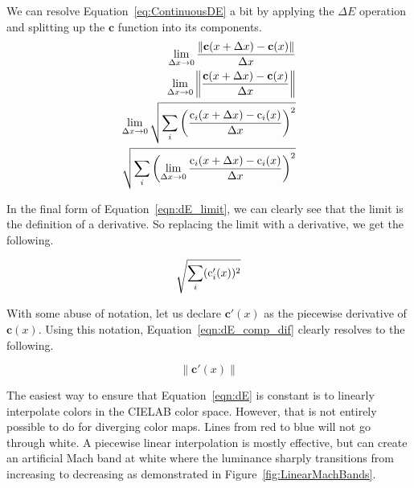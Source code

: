 \documentclass{acmsiggraph}               %
\newcommand{\Lab}{CIELAB\xspace}
\newcommand{\DeltaE}{\ensuremath{\Delta{}E}\xspace}
\newcommand*{\cvec}[1]{\mathbf{#1}}
\begin{document}
We can resolve Equation~\ref{eq:ContinuousDE} a bit by applying the \DeltaE
operation and splitting up the $\cvec{c}$ function into its components.
\begin{equation}
  \begin{split}
    { \lim_{\Delta x \rightarrow 0}
      \frac{\left\lVert \cvec{c}(x+\Delta x) - \cvec{c}(x) \right\rVert}
      {\Delta x}} \\
    { \lim_{\Delta x \rightarrow 0}
      \left\lVert \frac{\cvec{c}(x+\Delta x)- \cvec{c}(x)}
	  {\Delta x} \right\rVert } \\
    { \lim_{\Delta x \rightarrow 0}
      \sqrtsign{ \sum_i \left( \frac
	  {\operatorname{c}_i(x+\Delta x)
	    - \operatorname{c}_i(x)}
	  {\Delta x} \right)^2 } } \\
    {\sqrtsign{ \sum_i \left( \lim_{\Delta x \rightarrow 0}
       \frac
	  {\operatorname{c}_i(x+\Delta x)
	    - \operatorname{c}_i(x)}
	  {\Delta x} \right)^2 } }
  \end{split}
  \label{eqn:dE_limit}
\end{equation}

In the final form of Equation~\ref{eqn:dE_limit}, we can clearly see that
the limit is the definition of a derivative.  So replacing the limit with a
derivative, we get the following.

\begin{equation}
  \sqrtsign{\sum_i (\operatorname{c}_{i}'(x))^2}
  \label{eqn:dE_comp_dif}
\end{equation}

With some abuse of notation, let us declare $\cvec{c}'(x)$ as the piecewise
derivative of $\cvec{c}(x)$.  Using this notation,
Equation~\ref{eqn:dE_comp_dif} clearly resolves to the following.

\begin{equation}
  \left\lVert \cvec{c}'(x) \right\rVert
  \label{eqn:dE}
\end{equation}

The easiest way to ensure that Equation~\ref{eqn:dE} is constant
is to linearly interpolate colors in the \Lab color space.  However, that
is not entirely possible to do for diverging color maps.  Lines from red to
blue will not go through white.  A piecewise linear interpolation is mostly
effective, but can create an artificial Mach band at white where the
luminance sharply transitions from increasing to decreasing as demonstrated
in Figure~\ref{fig:LinearMachBands}.
\end{document}
